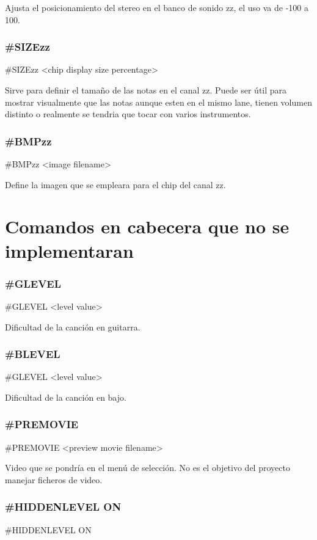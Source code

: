 \documentclass[a4paper,11pt,oneside]{book}
\begin{document}
Ajusta el posicionamiento del stereo en el banco de sonido zz, el uso va de -100 a 100.


\subsubsection{\#SIZEzz}
\#SIZEzz <chip display size percentage>

Sirve para definir el tamaño de las notas en el canal zz. Puede ser útil para mostrar visualmente que las notas aunque esten en el mismo lane, tienen volumen distinto o realmente se tendria que tocar con varios instrumentos.

\subsubsection{\#BMPzz}
\#BMPzz <image filename>

Define la imagen que se empleara para el chip del canal zz. 




\section{Comandos en cabecera que no se implementaran}

\subsubsection{\#GLEVEL}
\#GLEVEL <level value>

Dificultad de la canción en guitarra.

\subsubsection{\#BLEVEL}
\#GLEVEL <level value>

Dificultad de la canción en bajo.

\subsubsection{\#PREMOVIE}
\#PREMOVIE <preview movie filename>

Video que se pondría en el menú de selección. No es el objetivo del proyecto manejar ficheros de video.

\subsubsection{\#HIDDENLEVEL ON}
\#HIDDENLEVEL ON
\end{document}
